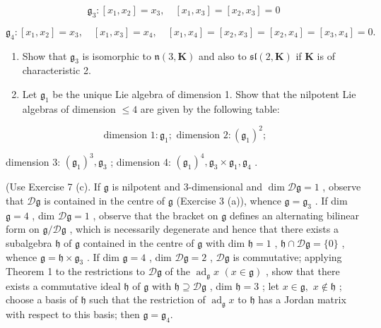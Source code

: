 \[
\mathfrak {g} _ {3}: \left[ x _ {1}, x _ {2} \right] = x _ {3}, \quad \left[ x _ {1}, x _ {3} \right] = \left[ x _ {2}, x _ {3} \right] = 0
\]

\[
\mathfrak {g} _ {4}: \left[ x _ {1}, x _ {2} \right] = x _ {3}, \quad \left[ x _ {1}, x _ {3} \right] = x _ {4}, \quad \left[ x _ {1}, x _ {4} \right] = \left[ x _ {2}, x _ {3} \right] = \left[ x _ {2}, x _ {4} \right] = \left[ x _ {3}, x _ {4} \right] = 0.
\]

\begin{enumerate}
\def\labelenumi{(\alph{enumi})}
\setcounter{enumi}{1}
\item
  Show that \(\mathfrak{g}_3\) is isomorphic to \(\mathfrak{n}(3, \mathbf{K})\) and also to \(\mathfrak{sl}(2, \mathbf{K})\) if \(\mathbf{K}\) is of characteristic 2.
\item
  Let \(\mathfrak{g}_1\) be the unique Lie algebra of dimension 1. Show that the nilpotent Lie algebras of dimension \(\leqslant 4\) are given by the following table:
\end{enumerate}

\[
\text { dimension } 1: \mathfrak {g} _ {1}; \text { dimension } 2: (\mathfrak {g} _ {1}) ^ {2};
\]

dimension 3: \((\mathfrak{g}_1)^3, \mathfrak{g}_3\) ; dimension 4: \((\mathfrak{g}_1)^4, \mathfrak{g}_3 \times \mathfrak{g}_1, \mathfrak{g}_4\) .

(Use Exercise 7 (c). If \(\mathfrak{g}\) is nilpotent and 3-dimensional and \(\dim \mathcal{D}\mathfrak{g} = 1\) , observe that \(\mathcal{D}\mathfrak{g}\) is contained in the centre of \(\mathfrak{g}\) (Exercise 3 (a)), whence \(\mathfrak{g} = \mathfrak{g}_3\) . If dim \(\mathfrak{g} = 4\) , dim \(\mathcal{D}\mathfrak{g} = 1\) , observe that the bracket on \(\mathfrak{g}\) defines an alternating bilinear form on \(\mathfrak{g} / \mathcal{D}\mathfrak{g}\) , which is necessarily degenerate and hence that there exists a subalgebra \(\mathfrak{h}\) of \(\mathfrak{g}\) contained in the centre of \(\mathfrak{g}\) with dim \(\mathfrak{h} = 1\) , \(\mathfrak{h}\cap \mathcal{D}\mathfrak{g} = \{0\}\) , whence \(\mathfrak{g} = \mathfrak{h}\times \mathfrak{g}_3\) . If dim \(\mathfrak{g} = 4\) , dim \(\mathcal{D}\mathfrak{g} = 2\) , \(\mathcal{D}\mathfrak{g}\) is commutative; applying Theorem 1 to the restrictions to \(\mathcal{D}\mathfrak{g}\) of the \(\operatorname{ad}_{\mathfrak{g}} x\) \((x\in \mathfrak{g})\) , show that there exists a commutative ideal \(\mathfrak{h}\) of \(\mathfrak{g}\) with \(\mathfrak{h}\supseteq \mathcal{D}\mathfrak{g}\) , dim \(\mathfrak{h} = 3\) ; let \(x\in \mathfrak{g},\) \(x\notin \mathfrak{h}\) ; choose a basis of \(\mathfrak{h}\) such that the restriction of \(\operatorname{ad}_{\mathfrak{g}}x\) to \(\mathfrak{h}\) has a Jordan matrix with respect to this basis; then \(\mathfrak{g} = \mathfrak{g}_4\).

